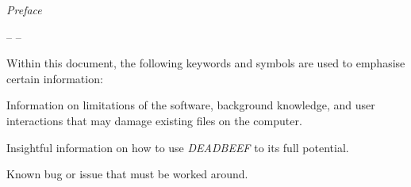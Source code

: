 \thispagestyle{empty}
\emph{Preface}%

\begin{flushleft}

-- --

\end{flushleft}

\noindent Within this document, the following keywords and symbols are used to \mbox{emphasise} certain information:
\begin{IMPORTANT}
Information on limitations of the software, background knowledge, and user interactions that may damage existing files on the computer.
\end{IMPORTANT}
\begin{USEFUL}
Insightful information on how to use \textit{DEADBEEF} to its full potential.
\end{USEFUL}		
\begin{BUG}
Known bug or issue that must be worked around.
\end{BUG}			
\addtocounter{page}{-1}
\newpage	
